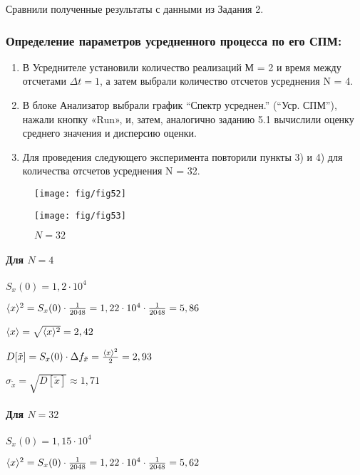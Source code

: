 \documentclass[a4paper,14pt]{extarticle}
\begin{document}
Сравнили полученные результаты с данными из Задания 2.
\subsubsection[Задание 5.1]{Определение параметров усредненного процесса по его СПМ:}
\begin{enumerate}
	\item В Усреднителе установили количество реализаций М = 2 и время между отсчетами $\Delta t = 1$, а затем выбрали количество отсчетов усреднения N = 4.
	\item В блоке Анализатор выбрали график “Спектр усреднен.” (“Уср. СПМ”), нажали кнопку «Run», и, затем, аналогично заданию 5.1 вычислили оценку среднего значения и дисперсию оценки.
	\item Для проведения следующего эксперимента повторили пункты 3) и 4) для количества отсчетов усреднения N = 32.
\end{enumerate}
 \begin{figure}[H]
	\begin{minipage}{.45\linewidth}
		\centering
       \texttt{[image: fig/fig52]}
	\caption*{$N = 4$}
	\end{minipage}
	\begin{minipage}{.45\linewidth}
		\centering
        \texttt{[image: fig/fig53]}
	\caption*{$N = 32$}
	\end{minipage}
\end{figure}
\paragraph{Для $N=4$}%


$S_x(0)=1,2\cdot 10^4$

$\langle x\rangle^2 = S_x(0)\cdot \frac{1}{2048}= 1,22\cdot 10^4\cdot \frac{1}{2048} = 5,86$

$\langle x\rangle =  \sqrt{\langle x\rangle^2} = 2,42$

$D[\tilde{x}] = S_x(0)\cdot \Delta f_{\tilde{x}} =\frac{\langle x\rangle^2}{2} = 2,93$

$\sigma_{\tilde{x}} = \sqrt{D[\tilde{x}]}\approx 1,71$

\paragraph{Для $N=32$}%
$S_x(0)=1,15\cdot 10^4$

$\langle x\rangle^2 = S_x(0)\cdot \frac{1}{2048}= 1,22\cdot 10^4\cdot \frac{1}{2048} = 5,62$
\end{document}
